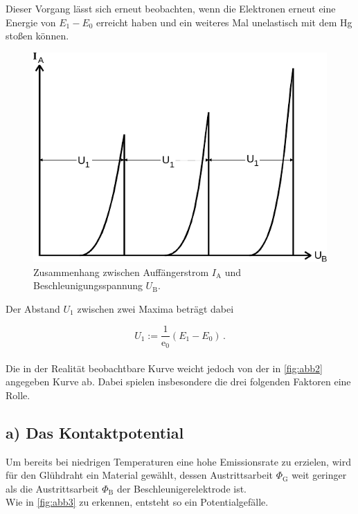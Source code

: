 Dieser Vorgang lässt sich erneut beobachten, wenn die Elektronen erneut
eine Energie von $E_1 - E_0$ erreicht haben und ein weiteres Mal unelastisch mit
dem Hg stoßen können.

\begin{figure}[H]
    \centering
    \includegraphics{figures/Abb_2.pdf}
    \caption{Zusammenhang zwischen Auffängerstrom $I_\text{A}$ und Beschleunigungsspannung $U_\text{B}$\cite{ap08}.}
    \label{fig:abb2}
\end{figure}

Der Abstand $U_1$ zwischen zwei Maxima beträgt dabei

\begin{equation}
    U_1 := \frac{1}{\text{e}_0} (E_1 - E_0) \,.
\end{equation} \\

Die in der Realität beobachtbare Kurve weicht jedoch von der in \autoref{fig:abb2} angegeben Kurve ab.
Dabei spielen insbesondere die drei folgenden Faktoren eine Rolle.

\subsection*{a) Das Kontaktpotential}

Um bereits bei niedrigen Temperaturen eine hohe Emissionsrate zu erzielen, wird für den Glühdraht ein Material
gewählt, dessen Austrittsarbeit $\Phi_\text{G}$ weit geringer als die Austrittsarbeit $\Phi_\text{B}$ der
Beschleunigerelektrode ist. \\

Wie in \autoref{fig:abb3} zu erkennen, entsteht so ein Potentialgefälle.

